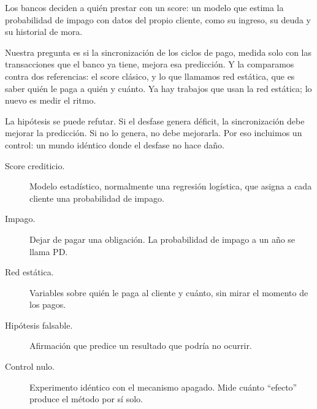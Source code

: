 \begin{decir}
Los bancos deciden a quién prestar con un score: un modelo que estima la probabilidad
de impago con datos del propio cliente, como su ingreso, su deuda y su historial de
mora.

Nuestra pregunta es si la sincronización de los ciclos de pago, medida solo con las
transacciones que el banco ya tiene, mejora esa predicción. Y la comparamos contra dos
referencias: el score clásico, y lo que llamamos red estática, que es saber quién le paga
a quién y cuánto. Ya hay trabajos que usan la red estática; lo nuevo es medir el ritmo.

La hipótesis se puede refutar. Si el desfase genera déficit, la sincronización debe
mejorar la predicción. Si no lo genera, no debe mejorarla. Por eso incluimos un control:
un mundo idéntico donde el desfase no hace daño.
\end{decir}
\begin{terminos}
\begin{description}
\item[Score crediticio.] Modelo estadístico, normalmente una regresión logística, que
asigna a cada cliente una probabilidad de impago.
\item[Impago.] Dejar de pagar una obligación. La probabilidad de impago a un año se
llama PD.
\item[Red estática.] Variables sobre quién le paga al cliente y cuánto, sin mirar el
momento de los pagos.
\item[Hipótesis falsable.] Afirmación que predice un resultado que podría no ocurrir.
\item[Control nulo.] Experimento idéntico con el mecanismo apagado. Mide cuánto
``efecto'' produce el método por sí solo.
\end{description}
\end{terminos}
\begin{preguntas}
\end{preguntas}


